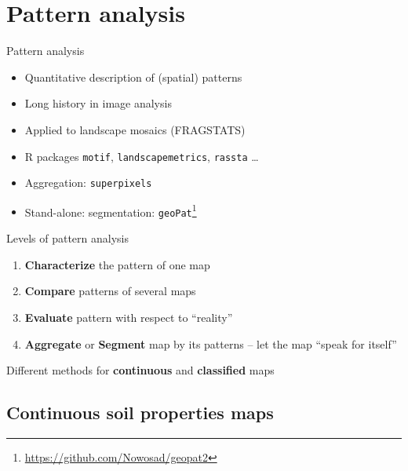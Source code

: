 \documentclass[aspectratio=169, 10pt]{beamer}
\begin{document}
\section{Pattern analysis}

\begin{frame}{Pattern analysis}
    \begin{itemize}
        \item Quantitative description of (spatial) patterns
        \item Long history in image analysis
        \item Applied to landscape mosaics (FRAGSTATS)
        \item R packages  \texttt{motif}, \texttt{landscapemetrics}, \texttt{rassta} \ldots
        \item Aggregation: \texttt{superpixels}
        \item Stand-alone: segmentation: \texttt{geoPat}\footnote{\url{https://github.com/Nowosad/geopat2}}
   \end{itemize}
\end{frame}

\begin{frame}{Levels of pattern analysis}
\begin{enumerate}
    \item \textbf{Characterize} the pattern of one map
    \item \textbf{Compare} patterns of several maps
    \item \textbf{Evaluate} pattern with respect to ``reality''
    \item \textbf{Aggregate} or \textbf{Segment} map by its patterns -- let the map ``speak for itself''
\end{enumerate}
\vspace{2ex}
Different methods for \textbf{continuous} and \textbf{classified} maps
\end{frame}

\subsection{Continuous soil properties maps}
\end{document}
